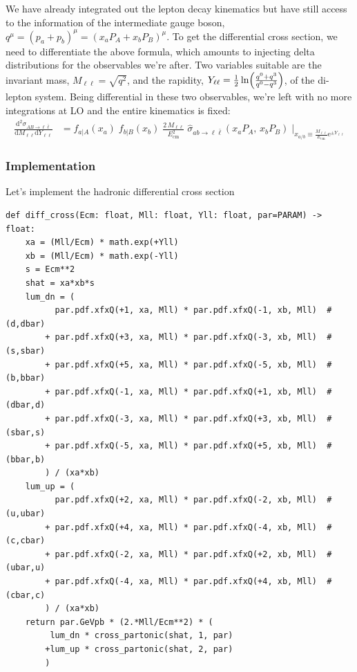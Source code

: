 \documentclass[11pt]{article}
\begin{document}
We have already integrated out the lepton decay kinematics but have still access to the information of the intermediate gauge boson, \(q^\mu = (p_a+p_b)^\mu = (x_a P_A + x_b P_B)^\mu\).
To get the differential cross section, we need to differentiate the above formula, which amounts to injecting delta distributions for the observables we're after.
Two variables suitable are the invariant mass, \(M_{\ell\ell} = \sqrt{q^2}\), and the rapidity, \(Y_{\ell\ell} = \tfrac{1}{2}\ln\Bigl(\tfrac{q^0+q^3}{q^0-q^3}\Bigr)\), of the di-lepton system.
Being differential in these two observables, we're left with no more integrations at LO and the entire kinematics is fixed:
\begin{align}
  \frac{\mathrm{d}^2\sigma_{A B \to \ell\bar{\ell}}}{\mathrm{d}M_{\ell\ell}\mathrm{d}Y_{\ell\ell}}
  &=
  f_{a\vert A}(x_a) \; f_{b\vert B}(x_b) \; \frac{2\,M_{\ell\ell}}{E_\mathrm{cm}^2} \;
  \hat{\sigma}_{ab\to\ell\bar{\ell}}(x_a P_A,\,x_b P_B)
  \;\bigg\vert_{x_{a/b}\equiv\tfrac{M_{\ell\ell}}{E_\mathrm{cm}}\mathrm{e}^{\pm Y_{\ell\ell}}}
\end{align}

\subsubsection{Implementation}
\label{sec:orge063784}
Let's implement the hadronic differential cross section
\begin{verbatim}
def diff_cross(Ecm: float, Mll: float, Yll: float, par=PARAM) -> float:
    xa = (Mll/Ecm) * math.exp(+Yll)
    xb = (Mll/Ecm) * math.exp(-Yll)
    s = Ecm**2
    shat = xa*xb*s
    lum_dn = (
          par.pdf.xfxQ(+1, xa, Mll) * par.pdf.xfxQ(-1, xb, Mll)  # (d,dbar)
        + par.pdf.xfxQ(+3, xa, Mll) * par.pdf.xfxQ(-3, xb, Mll)  # (s,sbar)
        + par.pdf.xfxQ(+5, xa, Mll) * par.pdf.xfxQ(-5, xb, Mll)  # (b,bbar)
        + par.pdf.xfxQ(-1, xa, Mll) * par.pdf.xfxQ(+1, xb, Mll)  # (dbar,d)
        + par.pdf.xfxQ(-3, xa, Mll) * par.pdf.xfxQ(+3, xb, Mll)  # (sbar,s)
        + par.pdf.xfxQ(-5, xa, Mll) * par.pdf.xfxQ(+5, xb, Mll)  # (bbar,b)
        ) / (xa*xb)
    lum_up = (
          par.pdf.xfxQ(+2, xa, Mll) * par.pdf.xfxQ(-2, xb, Mll)  # (u,ubar)
        + par.pdf.xfxQ(+4, xa, Mll) * par.pdf.xfxQ(-4, xb, Mll)  # (c,cbar)
        + par.pdf.xfxQ(-2, xa, Mll) * par.pdf.xfxQ(+2, xb, Mll)  # (ubar,u)
        + par.pdf.xfxQ(-4, xa, Mll) * par.pdf.xfxQ(+4, xb, Mll)  # (cbar,c)
        ) / (xa*xb)
    return par.GeVpb * (2.*Mll/Ecm**2) * (
         lum_dn * cross_partonic(shat, 1, par)
        +lum_up * cross_partonic(shat, 2, par)
        )
\end{verbatim}
\end{document}
